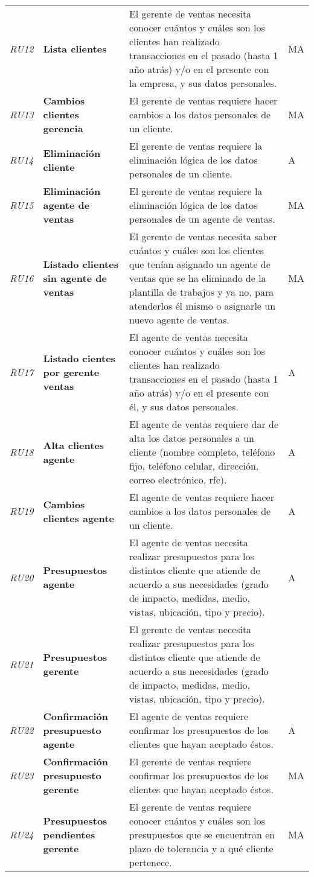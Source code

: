 \begin{longtable}[H]{m{2cm}m{3cm}m{5cm}m{2cm}}
\textit{RU12} &\textbf{Lista clientes} & El gerente de ventas necesita conocer cuántos y cuáles son los clientes han realizado transacciones en el pasado (hasta 1 año atrás) y/o en el presente con la empresa, y sus datos personales.  & MA\tabularnewline
\textit{RU13} &\textbf{Cambios clientes gerencia} & El gerente de ventas requiere hacer cambios a los datos personales de un cliente. & MA\tabularnewline
\textit{RU14} &\textbf{Eliminación cliente} & El gerente de ventas requiere la eliminación lógica de los datos personales de un cliente. & A\tabularnewline
\textit{RU15} &\textbf{Eliminación agente de ventas} & El gerente de ventas requiere la eliminación lógica de los datos personales de un agente de ventas. & MA\tabularnewline
\textit{RU16} &\textbf{Listado clientes sin agente de ventas} & El gerente de ventas necesita saber cuántos y cuáles son los clientes que tenían asignado un agente de ventas que se ha eliminado de la plantilla de trabajos y ya no, para atenderlos él mismo o asignarle un nuevo agente de ventas. & MA\tabularnewline
\textit{RU17} &\textbf{Listado cientes por gerente ventas} & El agente de ventas necesita conocer cuántos y cuáles son los clientes han realizado transacciones en el pasado (hasta 1 año atrás) y/o en el presente con él, y sus datos personales. & A\tabularnewline
\textit{RU18} &\textbf{Alta clientes agente} & El agente de ventas requiere dar de alta los datos personales a un cliente (nombre completo, teléfono fijo, teléfono celular, dirección, correo electrónico, rfc). & A\tabularnewline
\textit{RU19} &\textbf{Cambios clientes agente} & El agente de ventas requiere hacer cambios a los datos personales de un cliente. & A\tabularnewline
\textit{RU20} &\textbf{Presupuestos agente} & El agente de ventas necesita realizar presupuestos para los distintos cliente que atiende de acuerdo a sus necesidades (grado de impacto, medidas, medio, vistas, ubicación, tipo y precio). & A\tabularnewline
\textit{RU21} &\textbf{Presupuestos gerente} & El gerente de ventas necesita realizar presupuestos para los distintos cliente que atiende de acuerdo a sus necesidades (grado de impacto, medidas, medio, vistas, ubicación, tipo y precio). &\tabularnewline
\textit{RU22} &\textbf{Confirmación presupuesto agente} & El agente de ventas requiere confirmar los presupuestos de los clientes que hayan aceptado éstos. & A\tabularnewline
\textit{RU23} &\textbf{Confirmación presupuesto gerente} & El gerente de ventas requiere confirmar los presupuestos de los clientes que hayan aceptado éstos. & MA\tabularnewline
\textit{RU24} &\textbf{Presupuestos pendientes gerente} & El gerente de ventas requiere conocer cuántos y cuáles son los presupuestos que se encuentran en plazo de tolerancia y a qué cliente pertenece. & MA\tabularnewline

\end{longtable}
